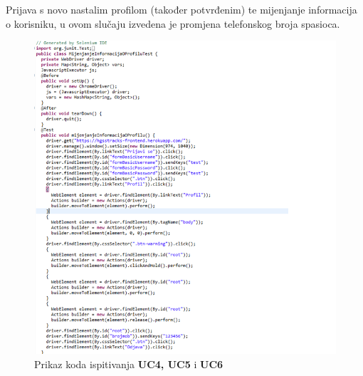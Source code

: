 			\newpage
			\begin{packed_item}
				\item {Prijava s novo nastalim profilom (također potvrđenim) te mijenjanje informacija o korisniku, u ovom slučaju izvedena je promjena telefonskog broja spasioca.}\\
				
				\begin{figure}[h!]
					\centering
					\includegraphics[width=\linewidth]{./slike/Slika2.png}
					\caption{Prikaz koda ispitivanja \textbf{UC4, UC5} i \textbf{UC6}}
				\end{figure}
				\eject
			\end{packed_item}
			\newpage
			
